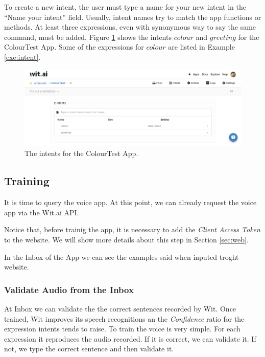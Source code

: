 \documentclass[twoside,11pt]{article}
\begin{document}
To create a new intent, the user must type a name for your new intent in the ``Name your intent'' field.
Usually, intent names try to match the app functions or methods. 
At least three expressions, even with synonymous way to say the same command, must be added.
Figure \ref{fig:entents} shows the intents $colour$ and $greeting$ for the ColourTest App.
Some of the expressions for $colour$ are listed in Example \ref{exe:intent}.


\begin{figure}[!h]
    \includegraphics[width=\textwidth]{figures/entities.png}
    \caption{The intents for the ColourTest App.}
    \label{fig:entents}
\end{figure}


\subsection{Training}

It is time to query the voice app.
At this point, we can already request the voice app via the Wit.ai API.

Notice that, before trainig the app, it is necessary to add the \emph{Client Access Token} to the website.
We will show more details about this step in Section \ref{sec:web}.

In the Inbox of the App we can see the examples said when inputed troght website.

\subsubsection{Validate Audio from the Inbox}

At Inbox we can validate the the correct sentences recorded by Wit.
Once trained, Wit improves its speech recognitions an the \emph{Confidence} ratio for the expression intents tends to raise.
To train the voice is very simple.
For each expression it reproduces the audio recorded.
If it is correct, we can validate it.
If not, we type the correct sentence and then validate it.
\end{document}
